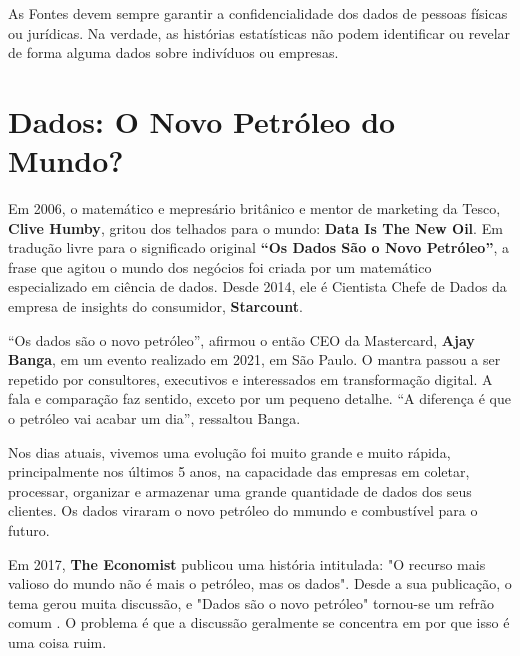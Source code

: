  As Fontes devem sempre garantir a confidencialidade dos dados de pessoas físicas ou jurídicas. Na verdade, as histórias estatísticas não podem identificar ou revelar de forma alguma dados sobre indivíduos ou empresas.\vskip0.3cm 



 \section{Dados: O Novo Petróleo do Mundo?}

Em 2006, o matemático e mepresário britânico e mentor de marketing da Tesco, \textbf{Clive Humby}, gritou dos telhados para o mundo: \textbf{Data Is The New Oil}. Em tradução livre para o significado original \textbf{“Os Dados São o Novo Petróleo”}, a frase que agitou o mundo dos negócios foi criada por um matemático especializado em ciência de dados. Desde 2014, ele é Cientista Chefe de Dados da empresa de insights do consumidor, \textbf{Starcount}. \vskip0.3cm 




“Os dados são o novo petróleo”, afirmou o então CEO da Mastercard, \textbf{Ajay Banga}, em um evento realizado em 2021, em São Paulo. O mantra passou a ser repetido por consultores, executivos e interessados em transformação digital. A fala e comparação faz sentido, exceto por um pequeno detalhe. “A diferença é que o petróleo vai acabar um dia”, ressaltou Banga.\vskip0.3cm 



Nos dias atuais, vivemos uma evolução foi muito grande e muito rápida, principalmente nos últimos 5 anos, na capacidade das empresas em coletar, processar, organizar e armazenar uma grande quantidade de dados dos seus clientes. Os dados viraram o novo petróleo do mmundo e combustível para o futuro.\vskip0.3cm 







 Em 2017, \textbf{The Economist} publicou uma história intitulada: "O recurso mais valioso do mundo não é mais o petróleo, mas os dados". Desde a sua publicação, o tema gerou muita discussão, e "Dados são o novo petróleo" tornou-se um refrão comum . O problema é que a discussão geralmente se concentra em por que isso é uma coisa ruim.\vskip0.3cm 


